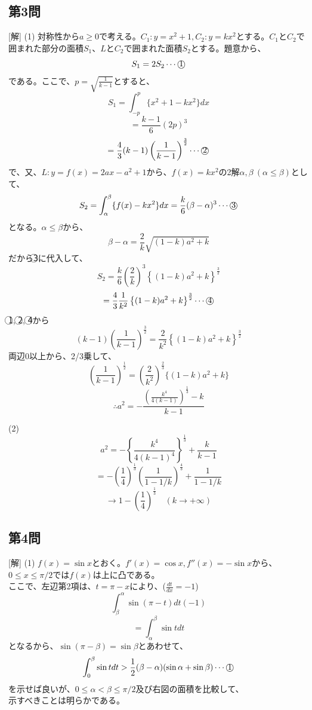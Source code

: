 \documentclass[../main.tex]{subfiles}
\begin{document}
\subsection*{第3問}
[解] (1) 対称性から$a \ge 0$で考える。$C_1: y=x^2+1, C_2: y=kx^2$とする。$C_1$と$C_2$で囲まれた部分の面積$S_1$、$L$と$C_2$で囲まれた面積$S_2$とする。題意から、
$$
S_1 = 2S_2 \cdots \text{\textcircled{1}}
$$
である。ここで、$p = \sqrt{\frac{1}{k-1}}$とすると、
$$
S_1 = \int_{-p}^p \{ x^2+1 - kx^2 \} dx
$$
$$
= \frac{k-1}{6} (2p)^3
$$
$$
= \frac{4}{3} (k-1) \left( \frac{1}{k-1} \right)^{\frac{3}{2}} \cdots \text{\textcircled{2}}
$$
で、又、$L: y = f(x) = 2ax - a^2 + 1$から、$f(x) = kx^2$の2解$\alpha, \beta \ (\alpha \le \beta)$として、
$$
S_2 = \int_\alpha^\beta \{ f(x) - kx^2 \} dx = \frac{k}{6}(\beta-\alpha)^3 \cdots \text{\textcircled{3}}
$$
となる。$\alpha \le \beta$から、
$$
\beta - \alpha = \frac{2}{k}\sqrt{(1-k)a^2+k}
$$
だから\textcircled{3}に代入して、
$$
S_2 = \frac{k}{6} \left( \frac{2}{k} \right)^3 \left\{ (1-k)a^2+k \right\}^{\frac{3}{2}}
$$
$$
= \frac{4}{3}\frac{1}{k^2} \left\{ (1-k)a^2+k \right\}^{\frac{3}{2}} \cdots \text{\textcircled{4}}
$$
\textcircled{1}, \textcircled{2}, \textcircled{4}から
$$
(k-1)\left(\frac{1}{k-1}\right)^{\frac{3}{2}} = \frac{2}{k^2} \left\{ (1-k)a^2+k \right\}^{\frac{3}{2}}
$$
両辺0以上から、2/3乗して、
$$
\left(\frac{1}{k-1}\right)^{\frac{1}{2}} = \left(\frac{2}{k^2}\right)^{\frac{2}{3}} \{ (1-k)a^2+k \}
$$
$$
\therefore a^2 = - \frac{ \left(\frac{k^4}{4(k-1)}\right)^{\frac{1}{3}} - k }{k-1}
$$

(2)
$$
a^2 = - \left\{ \frac{k^4}{4(k-1)^4} \right\}^{\frac{1}{3}} + \frac{k}{k-1}
$$
$$
= - \left( \frac{1}{4} \right)^{\frac{1}{3}} \left( \frac{1}{1-1/k} \right)^{\frac{4}{3}} + \frac{1}{1-1/k}
$$
$$
\longrightarrow 1 - \left( \frac{1}{4} \right)^{\frac{1}{3}} \quad (k \to +\infty)
$$

\subsection*{第4問}
[解] (1) $f(x) = \sin x$とおく。$f'(x) = \cos x, f''(x) = -\sin x$から、$0 \le x \le \pi/2$では$f(x)$は上に凸である。\\
ここで、左辺第2項は、$t = \pi - x$により、($\frac{dt}{dx} = -1$)
$$
\int_\beta^\alpha \sin(\pi-t) dt (-1)
$$
$$
= \int_\alpha^\beta \sin t dt
$$
となるから、$\sin(\pi-\beta) = \sin\beta$とあわせて、
$$
\int_0^\beta \sin t dt > \frac{1}{2}(\beta-\alpha)(\sin\alpha + \sin\beta) \cdots \text{\textcircled{1}}
$$
を示せば良いが、$0 \le \alpha < \beta \le \pi/2$及び右図の面積を比較して、\\
示すべきことは明らかである。
\end{document}
